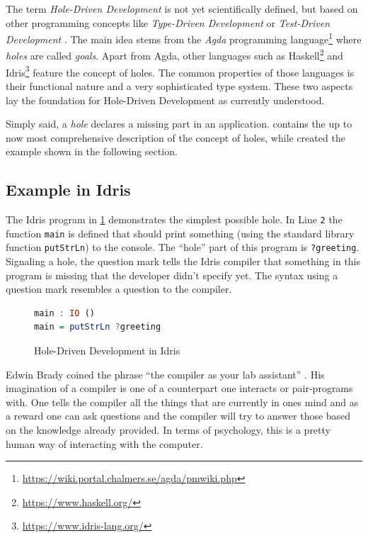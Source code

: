 \label{sec:hole-driven-development}
The term \emph{Hole-Driven Development} is not yet scientifically defined, but based on other programming concepts like \emph{Type-Driven Development} \autocite{brady_type-driven_2017} or \emph{Test-Driven Development} \autocite{mccracken_digital_1957}.
The main idea stems from the \emph{Agda} programming language\footnote{\url{https://wiki.portal.chalmers.se/agda/pmwiki.php}} where \emph{holes} are called \emph{goals}.
Apart from Agda, other languages such as Haskell\footnote{\url{https://www.haskell.org/}} and Idris\footnote{\url{https://www.idris-lang.org/}} feature the concept of holes.
The common properties of those languages is their functional nature and a very sophisticated type system.
These two aspects lay the foundation for Hole-Driven Development as currently understood.

Simply said, a \emph{hole} declares a missing part in an application.
\textcite{gamari_haskell_2019} contains the up to now most comprehensive description of the concept of holes, while \textcite{brady_type-driven_2017} created the example shown in the following section.

\subsection{Example in Idris}
\label{sub:hole-driven-development-in-idris}
The Idris program in \cref{fig:idris-program-hole} demonstrates the simplest possible hole.
In Line \verb|2| the function \verb|main| is defined that should print something (using the standard library function \verb|putStrLn|) to the console.
The ``hole'' part of this program is \verb|?greeting|.
Signaling a hole, the question mark tells the Idris compiler that something in this program is missing that the developer didn't specify yet.
The syntax using a question mark resembles a question to the compiler.

\begin{figure}[h!]
\begin{lstlisting}[language=Haskell,firstnumber=1]
main : IO ()
main = putStrLn ?greeting
\end{lstlisting}
\caption{Hole-Driven Development in Idris}
\label{fig:idris-program-hole}
\end{figure}

Edwin Brady coined the phrase ``the compiler as your lab assistant'' \autocite{brady_type-driven_2017}.
His imagination of a compiler is one of a counterpart one interacts or pair-programs with.
One tells the compiler all the things that are currently in ones mind and as a reward one can ask questions and the compiler will try to answer those based on the knowledge already provided.
In terms of psychology, this is a pretty human way of interacting with the computer.

